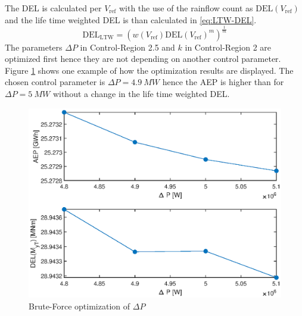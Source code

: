 The \gls{DEL} is calculated per $V_{\text{ref}}$ with the use of the rainflow count as $\text{DEL}(V_{\text{ref}})$ and the life time weighted \gls{DEL} is than calculated in \ref{eq:LTW-DEL}.
\begin{equation}
	\text{DEL}_{\text{LTW}} = \left(w(V_{\text{ref}})\text{DEL}(V_{\text{ref}})^m\right)^{\frac{1}{m}} 
	\label{eq:LTW-DEL}
\end{equation}
The parameters $\Delta P$ in Control-Region 2.5 and  $k$ in Control-Region 2 are optimized first hence they are not depending on another control parameter. Figure \ref{fig:DeltaP} shows one example of how the optimization results are displayed. The chosen control parameter is $\Delta P = \SI{4.9}{MW}$ hence the \gls{AEP} is higher than for $\Delta P = \SI{5}{MW}$ without a change in the life time weighted \gls{DEL}.
\begin{figure}[tbh]
	\centering	
	\includegraphics[width=12cm]{Figures/DeltaPopt.eps}
	\caption{Brute-Force optimization of $\Delta P$}
	\label{fig:DeltaP}
\end{figure}